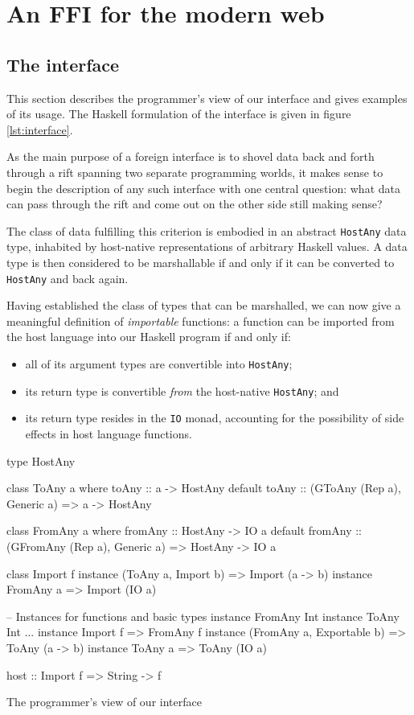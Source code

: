\documentclass[preprint]{sigplanconf}
\begin{document}
\section{An FFI for the modern web}\label{sec:interface}
\subsection{The interface}
This section describes the programmer's view of our interface and gives
examples of its usage.
The Haskell formulation of the interface is given in figure \ref{lst:interface}.

As the main purpose of a foreign interface is to shovel data back and
forth through a rift spanning two separate programming worlds, it makes sense
to begin the description of any such interface with one central question:
what data can pass through the rift and come out on the other side still making
sense?

The class of data fulfilling this criterion is embodied in an
abstract \lstinline!HostAny! data type, inhabited by host-native
representations of arbitrary Haskell values.
A data type is then considered to be marshallable if and only if it can be
converted to \lstinline!HostAny! and back again.

Having established the class of types that can be marshalled, we can now give
a meaningful definition of \emph{importable} functions: a function can be
imported from the host language into our Haskell program if and only if:
\begin{itemize}
\item
  all of its argument types are convertible into \lstinline!HostAny!;
\item
  its return type is convertible \emph{from} the host-native
  \lstinline!HostAny!; and
\item
  its return type resides in the \lstinline!IO! monad, accounting for the
  possibility of side effects in host language functions.
\end{itemize}

\begin{listingfloat}
\begin{code}
  type HostAny

  class ToAny a where
    toAny :: a -> HostAny
    default toAny :: (GToAny (Rep a), Generic a)
                  => a -> HostAny

  class FromAny a where
    fromAny :: HostAny -> IO a
    default fromAny :: (GFromAny (Rep a), Generic a)
                    => HostAny -> IO a

  class Import f
  instance (ToAny a, Import b) => Import (a -> b)
  instance FromAny a           => Import (IO a)

  -- Instances for functions and basic types
  instance FromAny Int
  instance ToAny Int
  ...
  instance Import f => FromAny f
  instance (FromAny a, Exportable b) => ToAny (a -> b)
  instance ToAny a => ToAny (IO a)

  host :: Import f => String -> f
\end{code}
\caption{The programmer's view of our interface}
\label{lst:interface}
\end{listingfloat}
\end{document}
